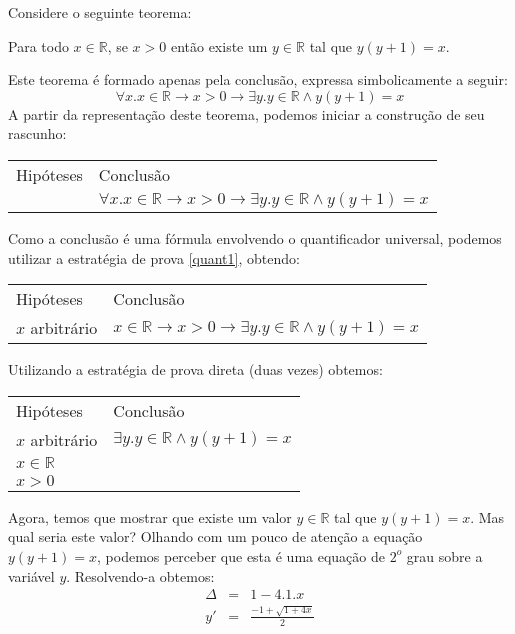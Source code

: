 \begin{Example}
Considere o seguinte teorema:
\begin{flushleft}
   Para todo $x\in\mathbb{R}$, se $x > 0$ então existe um $y\in\mathbb{R}$ tal que
   $y(y + 1) = x$.
\end{flushleft}
Este teorema é formado apenas pela conclusão, expressa simbolicamente
a seguir:
\[
\forall x. x\in\mathbb{R} \to x > 0 \to \exists y . y\in\mathbb{R}
\land y (y + 1) = x
\]
A partir da representação deste teorema, podemos iniciar a construção
de seu rascunho:
\begin{flushleft}
\begin{tabular}{ll}
Hipóteses & Conclusão \\
 & $\forall x. x\in\mathbb{R} \to x > 0 \to \exists y . y\in\mathbb{R}
\land y (y + 1) = x$\\
\end{tabular}
\end{flushleft}
Como a conclusão é uma fórmula envolvendo o quantificador universal,
podemos utilizar a estratégia de prova \ref{quant1}, obtendo:
\begin{flushleft}
\begin{tabular}{ll}
Hipóteses & Conclusão \\
 $x$ arbitrário & $ x\in\mathbb{R} \to x > 0 \to \exists y . y\in\mathbb{R}
\land y (y + 1) = x$\\
\end{tabular}
\end{flushleft}
Utilizando a estratégia de prova direta (duas vezes) obtemos:
\begin{flushleft}
\begin{tabular}{ll}
Hipóteses & Conclusão \\
 $x$ arbitrário & $\exists y . y\in\mathbb{R}
\land y (y + 1) = x$\\
$x\in\mathbb{R}$ & \\
$x > 0$ & \\
\end{tabular}
\end{flushleft}
Agora, temos que mostrar que existe um valor $y \in\mathbb{R}$ tal que
$y(y+1) = x$. Mas qual seria este valor? Olhando com um pouco de
atenção a equação $y(y+1) = x$, podemos perceber que esta é uma
equação de $2^o$ grau sobre a variável $y$. Resolvendo-a obtemos:
\[
\begin{array}{lcl}
\Delta & = & 1 -4.1.x \\
y' & = & \frac{-1 + \sqrt{1 + 4x}}{2}\\

\end{array}\]
\end{Example}
